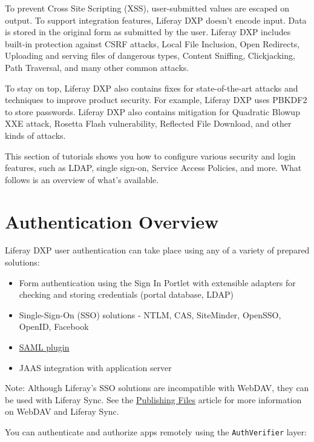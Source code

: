 To prevent Cross Site Scripting (XSS), user-submitted values are escaped
on output. To support integration features, Liferay DXP doesn't encode
input. Data is stored in the original form as submitted by the user.
Liferay DXP includes built-in protection against CSRF attacks, Local
File Inclusion, Open Redirects, Uploading and serving files of dangerous
types, Content Sniffing, Clickjacking, Path Traversal, and many other
common attacks.

To stay on top, Liferay DXP also contains fixes for state-of-the-art
attacks and techniques to improve product security. For example, Liferay
DXP uses PBKDF2 to store passwords. Liferay DXP also contains mitigation
for Quadratic Blowup XXE attack, Rosetta Flash vulnerability, Reflected
File Download, and other kinds of attacks.

This section of tutorials shows you how to configure various security
and login features, such as LDAP, single sign-on, Service Access
Policies, and more. What follows is an overview of what's available.

\section{Authentication Overview}\label{authentication-overview}

Liferay DXP user authentication can take place using any of a variety of
prepared solutions:

\begin{itemize}
\tightlist
\item
  Form authentication using the Sign In Portlet with extensible adapters
  for checking and storing credentials (portal database, LDAP)
\item
  Single-Sign-On (SSO) solutions - NTLM, CAS, SiteMinder, OpenSSO,
  OpenID, Facebook
\item
  \href{https://www.liferay.com/marketplace/-/mp/application/15188711}{SAML
  plugin}
\item
  JAAS integration with application server
\end{itemize}

Note: Although Liferay's SSO solutions are incompatible with WebDAV,
they can be used with Liferay Sync. See the
\href{/docs/7-1/user/-/knowledge_base/u/publishing-files}{Publishing
Files} article for more information on WebDAV and Liferay Sync.

You can authenticate and authorize apps remotely using the
\texttt{AuthVerifier} layer:

